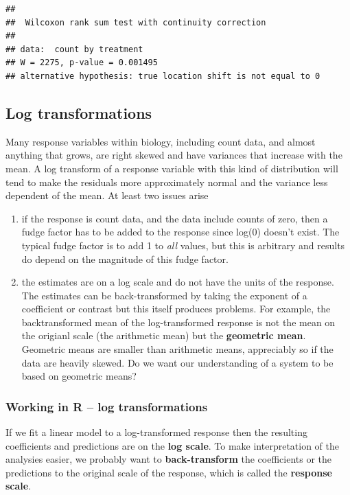 \documentclass[]{book}
\providecommand{\tightlist}{%
  \setlength{\itemsep}{0pt}\setlength{\parskip}{0pt}}
\begin{document}
\begin{verbatim}
## 
##  Wilcoxon rank sum test with continuity correction
## 
## data:  count by treatment
## W = 2275, p-value = 0.001495
## alternative hypothesis: true location shift is not equal to 0
\end{verbatim}

\hypertarget{log-transformations}{%
\subsection{Log transformations}\label{log-transformations}}

Many response variables within biology, including count data, and almost anything that grows, are right skewed and have variances that increase with the mean. A log transform of a response variable with this kind of distribution will tend to make the residuals more approximately normal and the variance less dependent of the mean. At least two issues arise

\begin{enumerate}
\def\labelenumi{\arabic{enumi}.}
\tightlist
\item
  if the response is count data, and the data include counts of zero, then a fudge factor has to be added to the response since log(0) doesn't exist. The typical fudge factor is to add 1 to \emph{all} values, but this is arbitrary and results do depend on the magnitude of this fudge factor.
\item
  the estimates are on a log scale and do not have the units of the response. The estimates can be back-transformed by taking the exponent of a coefficient or contrast but this itself produces problems. For example, the backtransformed mean of the log-transformed response is not the mean on the origianl scale (the arithmetic mean) but the \textbf{geometric mean}. Geometric means are smaller than arithmetic means, appreciably so if the data are heavily skewed. Do we want our understanding of a system to be based on geometric means?
\end{enumerate}

\hypertarget{working-in-r-log-transformations}{%
\subsubsection{Working in R -- log transformations}\label{working-in-r-log-transformations}}

If we fit a linear model to a log-transformed response then the resulting coefficients and predictions are on the \textbf{log scale}. To make interpretation of the analysies easier, we probably want to \textbf{back-transform} the coefficients or the predictions to the original scale of the response, which is called the \textbf{response scale}.
\end{document}
